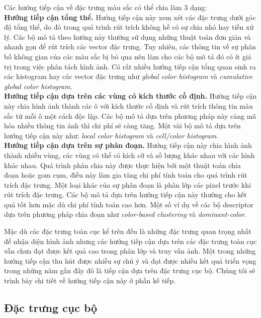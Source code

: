 Các hướng tiếp cận về đặc trưng màu sắc có thể chia làm 3 dạng:\\
\textbf{Hướng tiếp cận tổng thể.} Hướng tiếp cận này xem xét các đặc trưng dưới góc độ tổng thể, do đó trong quá trình rút trích không hề có sự chia nhỏ hay tiền xử lý. Các bộ mô tả theo hướng này thường sử dụng những thuật toán đơn giản và nhanh gọn để rút trích các vector đặc trưng. Tuy nhiên, các thông tin về sự phân bố không gian của các màu sắc bị bỏ qua nên làm cho các bộ mô tả đó có ít giá trị trong việc phân tách hình ảnh. Có rất nhiều hướng tiếp cận tổng quan sinh ra các histogram hay các vector đặc trưng như \textit{global color histogram}\cite{swain1991color} và \textit{cumulative global color histogram}\cite{stricker1995similarity}.\\
\textbf{Hướng tiếp cận dựa trên các vùng có kích thước cố định.} Hướng tiếp cận này chia hình ảnh thành các ô với kích thước cố định và rút trích thông tin màu sắc từ mỗi ô một cách độc lập. Các bộ mô tả dựa trên phương pháp này càng mã hóa nhiều thông tin ảnh thì chi phí sẽ càng tăng. Một vài bộ mô tả dựa trên hướng tiếp cận này như: \textit{local color histogram}\cite{swain1991color} và \textit{cell/color histogram}\cite{stehling2003cell}.\\
\textbf{Hướng tiếp cận dựa trên sự phân đoạn.} Hướng tiếp cận này chia hình ảnh thành nhiều vùng, các vùng có thể có kích cỡ và số lượng khác nhau với các hình khác nhau. Quá trình phân chia này được thực hiện bởi một thuật toán chia đoạn hoặc gom cụm, điều này làm gia tăng chi phí tính toán cho quá trình rút trích đặc trưng. Một loại khác của sự phân đoạn là phân lớp các pixel trước khi rút trích đặc trưng. Các bộ mô tả dựa trên hướng tiếp cận này thường cho kết quả tốt hơn mặc dù chi phí tính toán cao hơn. Một số ví dụ về các bộ descriptor dựa trên phương pháp chia đoạn như \textit{color-based clustering}\cite{stehling2003cell} và \textit{dominant-color}\cite{deng2001efficient, manjunath2001color}.

Mặc dù các đặc trưng toàn cục kể trên đều là những đặc trưng quan trọng nhất để nhận diện hình ảnh nhưng các hướng tiếp cận dựa trên các đặc trưng toàn cục vẫn chưa đạt được kết quả cao trong phân lớp và truy vấn ảnh. Một trong những hướng tiếp cận thu hút được nhiều sự chú ý và đạt được nhiều kết quả triển vọng trong những năm gần đây đó là tiếp cận dựa trên đặc trưng cục bộ. Chúng tôi sẽ trình bày chi tiết về hướng tiếp cận này ở phần kế tiếp.


\subsection{Đặc trưng cục bộ}
\label{local-features}

